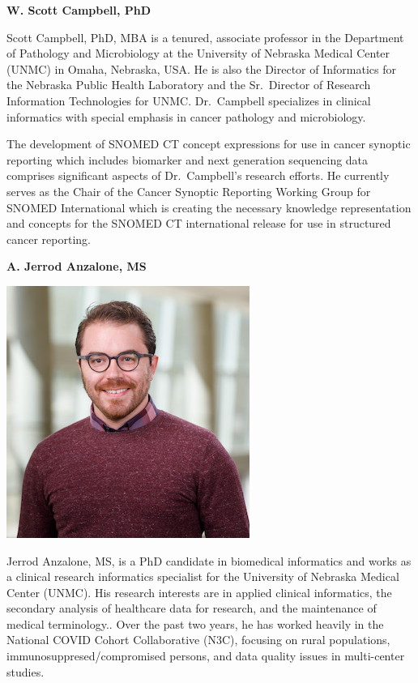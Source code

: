 \documentclass[
]{journal}
\begin{document}
\textbf{W. Scott Campbell, PhD}

Scott Campbell, PhD, MBA is a tenured, associate professor in the Department of Pathology and Microbiology at the University of Nebraska Medical Center (UNMC) in Omaha, Nebraska, USA. He is also the Director of Informatics for the Nebraska Public Health Laboratory and the Sr.~Director of Research Information Technologies for UNMC. Dr.~Campbell specializes in clinical informatics with special emphasis in cancer pathology and microbiology.

The development of SNOMED CT concept expressions for use in cancer synoptic reporting which includes biomarker and next generation sequencing data comprises significant aspects of Dr.~Campbell's research efforts. He currently serves as the Chair of the Cancer Synoptic Reporting Working Group for SNOMED International which is creating the necessary knowledge representation and concepts for the SNOMED CT international release for use in structured cancer reporting.

\textbf{A. Jerrod Anzalone, MS}

\begin{flushleft}\includegraphics[width=0.5\linewidth]{assets/biography/jerrodanzalone} \end{flushleft}

Jerrod Anzalone, MS, is a PhD candidate in biomedical informatics and works as a clinical research informatics specialist for the University of Nebraska Medical Center (UNMC). His research interests are in applied clinical informatics, the secondary analysis of healthcare data for research, and the maintenance of medical terminology.. Over the past two years, he has worked heavily in the National COVID Cohort Collaborative (N3C), focusing on rural populations, immunosuppresed/compromised persons, and data quality issues in multi-center studies.
\end{document}
